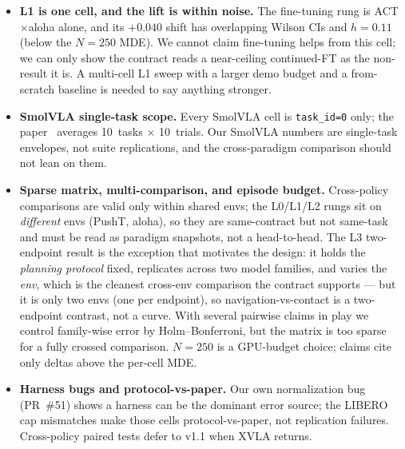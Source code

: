 \documentclass[10pt]{article}
\begin{document}
\begin{itemize}
    attempted SmolVLA LoRA track that collapsed ($0.252\to{\sim}0$),
    reported as a failed lift rather than dropped.
    \item \textbf{L1 is one cell, and the lift is within noise.} The
    fine-tuning rung is ACT$\times$aloha alone, and its $+0.040$ shift has
    overlapping Wilson CIs and $h{=}0.11$ (below the $N{=}250$ MDE). We
    cannot claim fine-tuning helps from this cell; we can only show the
    contract reads a near-ceiling continued-FT as the non-result it is. A
    multi-cell L1 sweep with a larger demo budget and a from-scratch
    baseline is needed to say anything stronger.
    \item \textbf{SmolVLA single-task scope.} Every SmolVLA cell is
    \texttt{task\_id=0} only; the paper~\cite{shukor2025smolvla} averages
    10~tasks $\times$ 10~trials. Our SmolVLA numbers are single-task
    envelopes, not suite replications, and the cross-paradigm comparison
    should not lean on them.
    \item \textbf{Sparse matrix, multi-comparison, and episode budget.}
    Cross-policy comparisons are valid only within shared envs; the
    L0/L1/L2 rungs sit on \emph{different} envs (PushT, aloha), so they are
    same-contract but not same-task and must be read as paradigm
    snapshots, not a head-to-head. The L3 two-endpoint result is the exception
    that motivates the design: it holds the \emph{planning protocol} fixed,
    replicates across two model families, and varies the \emph{env}, which
    is the cleanest cross-env comparison the contract supports --- but it is
    only two envs (one per endpoint), so navigation-vs-contact is a
    two-endpoint contrast, not a curve. With several pairwise claims in
    play we control family-wise error by Holm--Bonferroni, but the matrix
    is too sparse for a fully crossed comparison. $N{=}250$ is a
    GPU-budget choice; claims cite only deltas above the per-cell MDE.
    \item \textbf{Harness bugs and protocol-vs-paper.} Our own
    normalization bug (PR~\#51) shows a harness can be the dominant error
    source; the LIBERO cap mismatches make those cells protocol-vs-paper,
    not replication failures. Cross-policy paired tests defer to v1.1 when
    XVLA returns.
\end{itemize}
\end{document}
